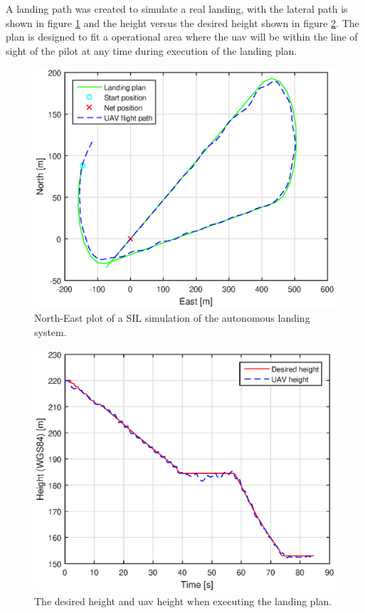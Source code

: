 A landing path was created to simulate a real landing, with the lateral path is shown in figure \ref{Fig:SILNorthEast090145} and the height versus the desired height  shown in figure \ref{Fig:SILHeight6juni090145}. The plan is designed to fit a operational area where the \gls{uav} will be within the line of sight of the pilot at any time during execution of the landing plan.
\begin{figure}[H]
\centering
\includegraphics[scale=0.7]{figs/SysPlot/SILNorthEast6juni090145.eps}
\caption{North-East plot of a SIL simulation of the autonomous landing system.}
\label{Fig:SILNorthEast090145}
\end{figure}
\begin{figure}[H]
\centering
\includegraphics[scale=0.7]{figs/SysPlot/SILHeight6juni090145.eps}
\caption{The desired height and \gls{uav} height when executing the landing plan.}
\label{Fig:SILHeight6juni090145}
\end{figure}
